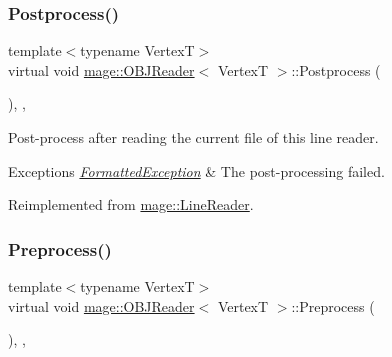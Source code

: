 \hypertarget{classmage_1_1_o_b_j_reader_a248977c8300575ed2bab04df26197919}{}\label{classmage_1_1_o_b_j_reader_a248977c8300575ed2bab04df26197919} 
\subsubsection{\texorpdfstring{Postprocess()}{Postprocess()}}
{\footnotesize\ttfamily template$<$typename VertexT$>$ \\
virtual void \hyperlink{classmage_1_1_o_b_j_reader}{mage\+::\+O\+B\+J\+Reader}$<$ VertexT $>$\+::Postprocess (\begin{DoxyParamCaption}{ }\end{DoxyParamCaption})\hspace{0.3cm}{\ttfamily [override]}, {\ttfamily [private]}, {\ttfamily [virtual]}}

Post-\/process after reading the current file of this line reader.


\begin{DoxyExceptions}{Exceptions}
{\em \hyperlink{structmage_1_1_formatted_exception}{Formatted\+Exception}} & The post-\/processing failed. \\
\hline
\end{DoxyExceptions}


Reimplemented from \hyperlink{classmage_1_1_line_reader_adfde21013140a1058d3dd567204abfb5}{mage\+::\+Line\+Reader}.

\hypertarget{classmage_1_1_o_b_j_reader_ae3a3ad3b50f1dd8dffe3109fc7dc2937}{}\label{classmage_1_1_o_b_j_reader_ae3a3ad3b50f1dd8dffe3109fc7dc2937} 
\subsubsection{\texorpdfstring{Preprocess()}{Preprocess()}}
{\footnotesize\ttfamily template$<$typename VertexT$>$ \\
virtual void \hyperlink{classmage_1_1_o_b_j_reader}{mage\+::\+O\+B\+J\+Reader}$<$ VertexT $>$\+::Preprocess (\begin{DoxyParamCaption}{ }\end{DoxyParamCaption})\hspace{0.3cm}{\ttfamily [override]}, {\ttfamily [private]}, {\ttfamily [virtual]}}

